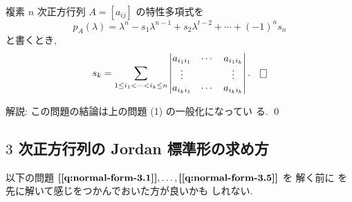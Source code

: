 \documentclass[12pt,twoside]{jarticle}
\begin{document}

\begin{question}
  複素 $n$ 次正方行列 $A=[a_{ij}]$ の特性多項式を
  \begin{equation*}
    p_A(\lambda) 
    = \lambda^n - s_1 \lambda^{n-1} + s_2 \lambda^{t-2} + \cdots + (-1)^n s_n
  \end{equation*}
  と書くとき,
  \begin{equation*}
    s_k = \sum_{1\le i_1<\cdots<i_k\le n}
    \begin{vmatrix}
      a_{i_1i_1} & \cdots & a_{i_1i_k} \\
      \vdots     &        & \vdots \\
      a_{i_ki_1} & \cdots & a_{i_ki_k} \\
    \end{vmatrix}.
    \qed
  \end{equation*}
\end{question}

\noindent 
解説: この問題の結論は上の問題  (1) の一般化になってい
る.
\qed


\subsection{$3$ 次正方行列の Jordan 標準形の求め方}
\label{sec:3x3-Jordan}

以下の問題 %
$\text{\qref{q:normal-form-3.1}},\ldots,\text{\qref{q:normal-form-3.5}}$ を
解く前に  を先に解いて感じをつかんでおいた方が良いかも
しれない. 

\end{document}

